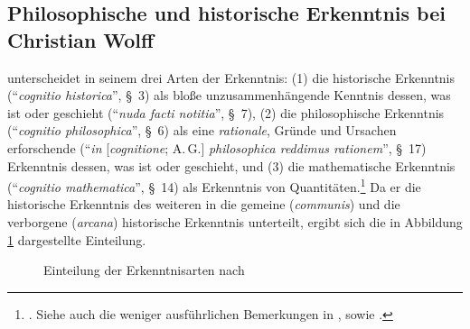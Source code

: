 \subsection{Philosophische und historische Erkenntnis bei
Christian Wolff}\label{paragraph:wolffswarnung}
 unterscheidet in seinem
 drei Arten der
Erkenntnis: (1) die historische Erkenntnis (\enquote{\emph{cognitio historica}},
\S~3) als bloße unzusammenhängende Kenntnis dessen, was ist oder geschieht
(\enquote{\emph{nuda facti notitia}}, \S~7), (2) die philosophische Erkenntnis
(\enquote{\emph{cognitio philosophica}}, \S~6) als eine \emph{rationale}, Gründe
und Ursachen erforschende (\enquote{\emph{in} [\emph{cognitione}; A.\,G.]
\emph{philosophica reddimus rationem}}, \S~17) Erkenntnis dessen, was ist oder
geschieht, und (3) die mathematische Erkenntnis (\enquote{\emph{cognitio
mathematica}}, \S~14) als Erkenntnis von
Quantitäten.\footnote{\cite[Vgl.][Cap.I.
De triplici cognitione
humana]{Wolff:Discursuspraeliminarisdephilosophiaingenere1996}. Siehe auch die
weniger ausführlichen Bemerkungen in
\cite[][Vorbericht]{Wolff:VernuenftigeGedankenvondenKraeftendesmenschlichenVerstandesundihremrichtigenGebraucheinErkenntnisderWahrheit1978},
sowie
\cite[][Praefatio]{Wolff:Cogitationesrationalesdeviribusintellectushumani1983}.}
Da er die historische Erkenntnis des weiteren in die gemeine (\emph{communis})
und die verborgene (\emph{arcana}) historische Erkenntnis unterteilt, ergibt
sich die in Abbildung \ref{abbildung:ZeichnungErkenntnisartennachWolff.pdf}
dargestellte Einteilung.

\begin{figure}[htb]
\begin{minipage}[t]{\textwidth}
\centering
{}
  \caption{Einteilung der Erkenntnisarten nach
  }\label{abbildung:ZeichnungErkenntnisartennachWolff.pdf}
\end{minipage}
\end{figure}

